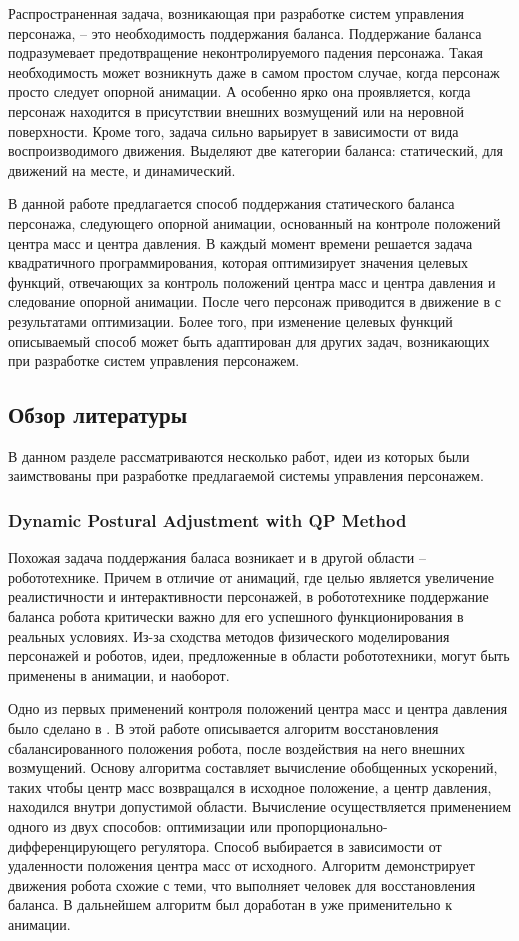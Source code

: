 Распространенная задача, возникающая при разработке систем управления персонажа, -- это необходимость поддержания баланса. Поддержание баланса подразумевает предотвращение неконтролируемого падения персонажа. Такая необходимость может возникнуть даже в самом простом случае, когда персонаж просто следует опорной анимации. А особенно ярко она проявляется, когда персонаж находится в присутствии внешних возмущений или на неровной поверхности. Кроме того, задача сильно варьирует в зависимости от вида воспроизводимого движения. Выделяют две категории баланса: статический, для движений на месте, и динамический.

В данной работе предлагается способ поддержания статического баланса персонажа, следующего опорной анимации, основанный на контроле положений центра масс и центра давления. В каждый момент времени решается задача квадратичного программирования, которая оптимизирует значения целевых функций, отвечающих за контроль положений центра масс и центра давления и следование опорной анимации. После чего персонаж приводится в движение в  с результатами оптимизации. Более того, при изменение целевых функций описываемый способ может быть адаптирован для других задач, возникающих при разработке систем управления персонажем.

\subsection{Обзор литературы}

В данном разделе рассматриваются несколько работ, идеи из которых были заимствованы при разработке предлагаемой системы управления персонажем.

\subsubsection{Dynamic Postural Adjustment with QP Method}

Похожая задача поддержания баласа возникает и в другой области -- робототехнике. Причем в отличие от анимаций, где целью является увеличение реалистичности и интерактивности персонажей, в робототехнике поддержание баланса робота критически важно для его успешного функционирования в реальных условиях. Из-за сходства методов физического моделирования персонажей и роботов, идеи, предложенные в области робототехники, могут быть применены в анимации, и наоборот.

Одно из первых применений контроля положений центра масс и центра давления было сделано в \cite{KudohKI}. В этой работе описывается алгоритм восстановления сбалансированного положения робота, после воздействия на него внешних возмущений. Основу алгоритма составляет вычисление обобщенных ускорений, таких чтобы центр масс возвращался в исходное положение, а центр давления, находился внутри допустимой области. Вычисление осуществляется применением одного из двух способов: оптимизации или пропорционально-дифференцирующего регулятора. Способ выбирается в зависимости от удаленности положения центра масс от исходного. Алгоритм демонстрирует движения робота схожие с теми, что выполняет человек для восстановления баланса. В дальнейшем алгоритм был доработан в \cite{MacchiettoZS} уже применительно к анимации.

